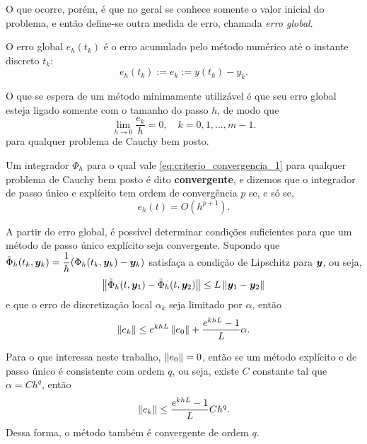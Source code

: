 O que ocorre, porém, é que no geral se conhece somente o valor inicial do problema, e então define-se outra medida de erro, chamada \textit{erro global}. 

\begin{definition}
    O erro global $e_h(t_k)$ é o erro acumulado pelo método numérico até o instante discreto $t_k$:
    \begin{equation*}
        e_h (t_k) := e_k := y(t_k) - y_k.
    \end{equation*}
\end{definition}

O que se espera de um método minimamente utilizável é que seu erro global esteja ligado somente com o tamanho do passo $h$, de modo que 
\begin{equation}\label{eq:criterio_convergencia_1}
    \lim_{h \to 0} \dfrac{e_k}{h} = 0, \quad k = 0, 1, ..., m-1.
\end{equation}
para qualquer problema de Cauchy bem posto. 

\begin{definition}\label{def:convergencia}
    Um integrador $\Phi_h$ para o qual vale \ref{eq:criterio_convergencia_1} para qualquer problema de Cauchy bem posto é dito \textbf{convergente}, e dizemos que o integrador de passo único e explícito tem ordem de convergência $p$ se, e só se,
    \begin{equation*}
        e_h(t) = O(h^{p+1}).
    \end{equation*}
\end{definition}

A partir do erro global, é possível determinar condições suficientes para que um método de passo único explícito seja convergente. Supondo que $\tilde{\Phi}_h (t_k, \bm y_k) = \dfrac{1}{h} (\Phi_h (t_k, \bm y_k) - \bm y_k)$ satisfaça a condição de Lipschitz para $\bm y$, ou seja,
\begin{equation*}
    \left\Vert \tilde{\Phi}_h(t, \bm y_1) - \tilde{\Phi}_h(t, \bm y_2) \right\Vert
    \leq
    L \left\Vert \bm y_1 - \bm y_2 \right\Vert
\end{equation*}
e que o erro de discretização local $\alpha_k$ seja limitado por $\alpha$, então \citep[29]{alexandre_megiorin_roma_metodos_nodate}
\begin{equation}
    \left\Vert e_k \right\Vert \leq e^{k h L} \left\Vert e_0 \right\Vert + \dfrac{e^{k h L} - 1}{L} \alpha.
\end{equation}

Para o que interessa neste trabalho, $\left\Vert e_0 \right\Vert = 0$, então se um método explícito e de passo único é consistente com ordem $q$, ou seja, existe $C$ constante tal que $\alpha = C h^q$, então
\begin{equation*}
    \left\Vert e_k \right\Vert \leq \dfrac{e^{k h L} - 1}{L} C h^q.
\end{equation*}
Dessa forma, o método também é convergente de ordem $q$.

